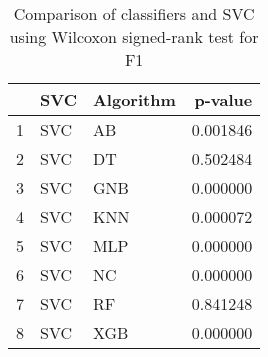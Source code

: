 \begin{table}
\footnotesize
\caption{Comparison of classifiers and SVC using Wilcoxon signed-rank test for F1}
\label{tab:SVC wilcoxon F1 comparison}
\begin{tabular}{lllr}
\hline
 & SVC & Algorithm & p-value \\
\hline
1 & SVC & AB & 0.001846 \\
2 & SVC & DT & 0.502484 \\
3 & SVC & GNB & 0.000000 \\
4 & SVC & KNN & 0.000072 \\
5 & SVC & MLP & 0.000000 \\
6 & SVC & NC & 0.000000 \\
7 & SVC & RF & 0.841248 \\
8 & SVC & XGB & 0.000000 \\
\hline
\end{tabular}
\end{table}
